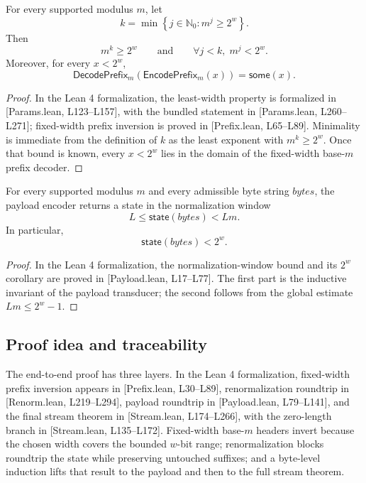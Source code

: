 \documentclass{system-security-article}
\newcommand{\set}[1]{\left\{ #1 \right\}}
\providecommand{\href}[2]{#2}
\newcommand{\EncodePrefixM}{\mathsf{EncodePrefix}_m}
\newcommand{\DecodePrefixM}{\mathsf{DecodePrefix}_m}
\newcommand{\Some}{\mathsf{some}}
\newcommand{\BaseM}{base-\(m\)}
\newcommand{\BytesVar}{\mathit{bytes}}
\newcommand{\LeanParams}[2]{\href{https://github.com/KyrylR/phd-symmetric-cryptography/blob/8e903222a7df1c4365592e4b16fa752a924b8977/lean/encoding-dr-1/EncodingProofs/BaseMLen/Params.lean\#L#1-L#2}{[Params.lean, L#1--L#2]}}
\newcommand{\LeanPrefix}[2]{\href{https://github.com/KyrylR/phd-symmetric-cryptography/blob/8e903222a7df1c4365592e4b16fa752a924b8977/lean/encoding-dr-1/EncodingProofs/BaseMLen/Prefix.lean\#L#1-L#2}{[Prefix.lean, L#1--L#2]}}
\newcommand{\LeanPayload}[2]{\href{https://github.com/KyrylR/phd-symmetric-cryptography/blob/8e903222a7df1c4365592e4b16fa752a924b8977/lean/encoding-dr-1/EncodingProofs/BaseMLen/Payload.lean\#L#1-L#2}{[Payload.lean, L#1--L#2]}}
\newcommand{\LeanRenorm}[2]{\href{https://github.com/KyrylR/phd-symmetric-cryptography/blob/8e903222a7df1c4365592e4b16fa752a924b8977/lean/encoding-dr-1/EncodingProofs/BaseMLen/Renorm.lean\#L#1-L#2}{[Renorm.lean, L#1--L#2]}}
\newcommand{\LeanStream}[2]{\href{https://github.com/KyrylR/phd-symmetric-cryptography/blob/8e903222a7df1c4365592e4b16fa752a924b8977/lean/encoding-dr-1/EncodingProofs/BaseMLen/Stream.lean\#L#1-L#2}{[Stream.lean, L#1--L#2]}}
\begin{document}
    \begin{theorem}
        \label{thm:k-minimal}
        For every supported modulus \(m\), let
        \[
            k = \min \set{j \in \mathbb{N}_0 : m^j \ge 2^{w}}.
        \]
        Then
        \[
            m^k \ge 2^{w}
            \qquad \text{and} \qquad
            \forall j < k,\; m^j < 2^{w}.
        \]
        Moreover, for every \(x < 2^{w}\),
        \[
            \DecodePrefixM(\EncodePrefixM(x)) = \Some(x).
        \]
    \end{theorem}

    \begin{proof}
        In the Lean 4 formalization, the least-width property is formalized in \LeanParams{123}{157},
        with the bundled statement in \LeanParams{260}{271}; fixed-width prefix inversion is proved in \LeanPrefix{65}{89}.
        Minimality is immediate from the definition of \(k\) as the least exponent with \(m^k \ge 2^{w}\).
        Once that bound is known, every \(x < 2^{w}\) lies in the domain of the fixed-width \BaseM{} prefix decoder.
    \end{proof}

    \begin{proposition}
        \label{prop:state-window}
        For every supported modulus \(m\) and every admissible byte string \(\BytesVar\), the payload encoder
        returns a state in the normalization window
        \[
            L \le \mathsf{state}(\BytesVar) < Lm.
        \]
        In particular,
        \[
            \mathsf{state}(\BytesVar) < 2^{w}.
        \]
    \end{proposition}

    \begin{proof}
        In the Lean 4 formalization, the normalization-window bound and its \(2^{w}\)
        corollary are proved in \LeanPayload{17}{77}.
        The first part is the inductive invariant of the payload transducer; the second follows from the
        global estimate \(Lm \le 2^{w}-1\).
    \end{proof}

    \subsection{Proof idea and traceability}
    \label{subsec:proof-skeleton}

    The end-to-end proof has three layers.
    In the Lean 4 formalization, fixed-width prefix inversion appears in \LeanPrefix{30}{89},
    renormalization roundtrip in \LeanRenorm{219}{294}, payload roundtrip in \LeanPayload{79}{141},
    and the final stream theorem in \LeanStream{174}{266}, with the zero-length branch in \LeanStream{135}{172}.
    Fixed-width \BaseM{} headers invert because the chosen width covers the bounded \(w\)-bit range;
    renormalization blocks roundtrip the state while preserving untouched suffixes; and a byte-level induction
    lifts that result to the payload and then to the full stream theorem.
\end{document}
